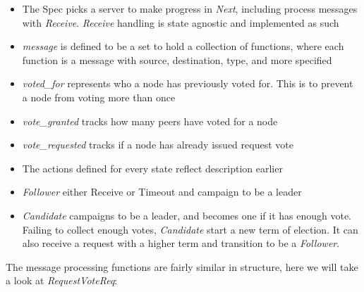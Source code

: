 \documentclass{report}
\begin{document}
\begin{tlatex}
\@pvspace{8.0pt}%
%
%
%
%
%
\@pvspace{8.0pt}%
%
%
%
%
%
%
\end{tlatex}

\begin{itemize}
    \item The Spec picks a server to make progress in \textit{Next}, including
    process messages with \textit{Receive}. \textit{Receive} handling is 
    state agnostic and implemented as such
    \item \textit{message} is defined to be a set to hold a collection of functions, where 
    each function is a message with source, destination, type, and more specified
    \item \textit{voted\_for} represents who a node has previously voted for. This is to 
    prevent a node from voting more than once
    \item \textit{vote\_granted} tracks how many peers have voted for a node
    \item \textit{vote\_requested} tracks if a node has already issued request vote
    \item The actions defined for every state reflect description earlier 
    \item \textit{Follower} either Receive or Timeout and campaign to be a leader
    \item \textit{Candidate} campaigns to be a leader, and becomes one if it has
    enough vote. Failing to collect enough votes, \textit{Candidate} start a new
    term of election. It can also receive a request with a higher term and
    transition to be a \textit{Follower}.
\end{itemize}


The message processing functions are fairly similar in structure, here we will
take a look at \textit{RequestVoteReq}:\newline
\end{document}
